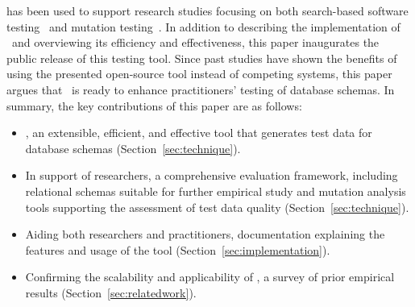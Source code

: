 
{\sa} has been used to support research studies focusing on both search-based software
testing~\cite{kapfhammer2013search,mcminn2015effectiveness,kinneer2015automatically} and mutation
testing~\cite{wright2013efficient,wright2014impact,wright2015mutation,mcminn2016virtual}.  In addition to describing the
implementation of \sa~and overviewing its efficiency and effectiveness, this paper inaugurates the public release of
this testing tool. Since past studies have shown the benefits of using the presented open-source tool instead of
competing systems, this paper argues that \sa~is ready to enhance practitioners' testing of database schemas.  In
summary, the key contributions of this paper are as follows:


\begin{itemize}


  \item {\sa}, an extensible, efficient, and effective tool that generates test data for database schemas
    (Section~\ref{sec:technique}).


  \item In support of researchers, a comprehensive evaluation framework, including relational schemas suitable for
    further empirical study and mutation analysis tools supporting the assessment of test data quality
    (Section~\ref{sec:technique}).


  \item Aiding both researchers and practitioners, documentation explaining the features and usage of the tool
    (Section~\ref{sec:implementation}).


  \item Confirming the scalability and applicability of \sa, a survey of prior empirical results
    (Section~\ref{sec:relatedwork}).

\end{itemize}
